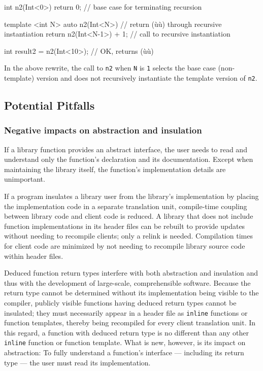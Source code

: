 \begin{emcppslisting}[emcppsbatch=e6]
int n2(Int<0>) { return 0; }     // base case for terminating recursion

template <int N>
auto n2(Int<N>)
    // return (ù{}ù) through recursive instantiation
{
    return n2(Int<N-1>{}) + 1;   // call to recursive instantiation
}

int result2 = n2(Int<10>{});     // OK, returns (ù{}ù)
\end{emcppslisting}
    

\noindent In the above rewrite, the call to \lstinline!n2! when \lstinline!N! is
\lstinline!1! selects the base case (non-template) version and does not
recursively instantiate the template version of \lstinline!n2!.

\subsection[Potential Pitfalls]{Potential Pitfalls}\label{potential-pitfalls}

\subsubsection[Negative impacts on abstraction and insulation]{Negative impacts on abstraction and insulation}\label{negative-impacts-on-abstraction-and-insulation}

If a library function provides an abstract interface, the user needs to
read and understand only the function's declaration and its
documentation. Except when maintaining the library itself, the
function's implementation details are unimportant.

If a program insulates a library user from the library's implementation
by placing the implementation code in a separate translation unit,
compile-time coupling between library code and client code is reduced. A
library that does not include function implementations in its header
files can be rebuilt to provide updates without needing to recompile
clients; only a relink is needed. Compilation times for client code are
minimized by not needing to recompile library source code within header
files.

Deduced function return types interfere with both abstraction and
insulation and thus with the development of large-scale, comprehensible
software. Because the return type cannot be determined without its
implementation being visible to the compiler, publicly visible functions
having deduced return types cannot be insulated; they must necessarily
appear in a header file as \lstinline!inline! functions or function
templates, thereby being recompiled for every client translation unit.
In this regard, a function with deduced return type is no different than
any other \lstinline!inline! function or function template. What is new,
however, is its impact on abstraction: To fully understand a function's
interface --- including its return type --- the user must read its
implementation.

